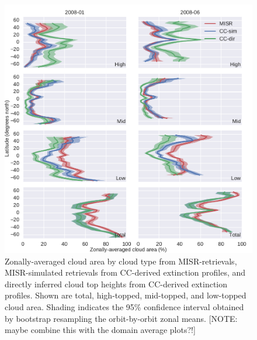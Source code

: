 \begin{figure}
\centering
\includegraphics[width=\columnwidth]{graphics/misr_cldmisr_zonal.pdf}
\caption{Zonally-averaged cloud area by cloud type from MISR-retrievals, MISR-simulated retrievals from CC-derived extinction profiles, and directly inferred cloud top heights from CC-derived extinction profiles. Shown are total, high-topped, mid-topped, and low-topped cloud area. Shading indicates the 95\% confidence interval obtained by bootstrap resampling the orbit-by-orbit zonal means. [NOTE: maybe combine this with the domain average plots?!]}
\label{misr_cldmisr_zonal}
\end{figure}

